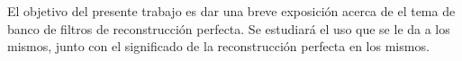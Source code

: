 El objetivo del presente trabajo es dar una breve exposición acerca de el tema de banco de filtros de reconstrucción perfecta. Se estudiará el uso que se le da a los mismos, junto con el significado de la reconstrucción perfecta en los mismos.
